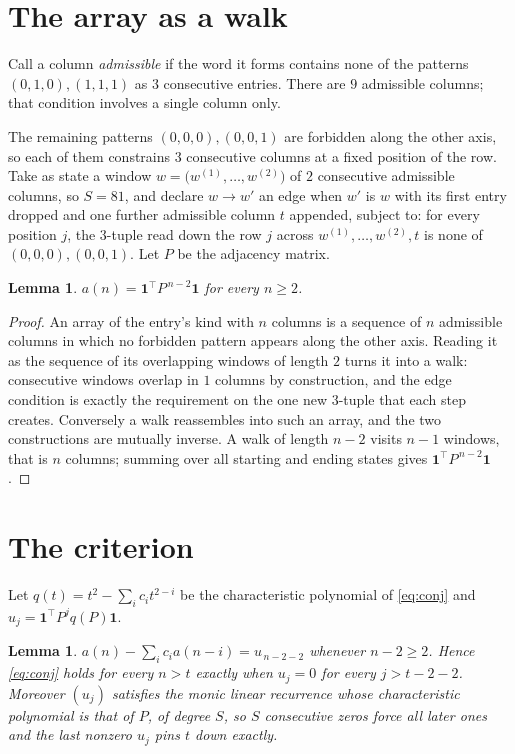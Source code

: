 \documentclass[11pt,a4paper]{article}
\theoremstyle{plain}
\newtheorem{lemma}[theorem]{Lemma}
\theoremstyle{definition}
\begin{document}
\section{The array as a walk}

Call a column \emph{admissible} if the word it forms contains none of the patterns
$(0,1,0), (1,1,1)$ as $3$ consecutive entries. There are $9$ admissible columns; that condition
involves a single column only.

The remaining patterns $(0,0,0), (0,0,1)$ are forbidden along the other axis, so each of them
constrains $3$ consecutive columns at a fixed position of the row. Take as state a
window $w=\bigl(w^{(1)},\dots,w^{(2)}\bigr)$ of $2$ consecutive admissible
columns, so $S=81$, and declare $w\to w'$ an edge when $w'$ is $w$ with its first entry
dropped and one further admissible column $t$ appended, subject to: for every position
$j$, the $3$-tuple read down the row $j$ across $w^{(1)},\dots,w^{(2)},t$
is none of $(0,0,0), (0,0,1)$. Let $P$ be the adjacency matrix.

\begin{lemma}\label{lem:walk}
$a(n)=\mathbf{1}^{\!\top}P^{\,n-2}\mathbf{1}$ for every $n\ge2$.
\end{lemma}

\begin{proof}
An array of the entry's kind with $n$ columns is a sequence of $n$ admissible columns in
which no forbidden pattern appears along the other axis. Reading it as the sequence of its
overlapping windows of length $2$ turns it into a walk: consecutive windows overlap in
$1$ columns by construction, and the edge condition is exactly the requirement on the one
new $3$-tuple that each step creates. Conversely a walk reassembles into such an array,
and the two constructions are mutually inverse. A walk of length $n-2$ visits $n-1$
windows, that is $n$ columns; summing over all starting and ending states gives
$\mathbf{1}^{\!\top}P^{\,n-2}\mathbf{1}$.
\end{proof}

\section{The criterion}

Let $q(t)=t^{2}-\sum_i c_i t^{2-i}$ be the characteristic polynomial of
\eqref{eq:conj} and $u_j=\mathbf{1}^{\!\top}P^{j}q(P)\mathbf{1}$.

\begin{lemma}\label{lem:crit}
$a(n)-\sum_i c_i a(n-i)=u_{\,n-2-2}$ whenever $n-2\ge2$. Hence
\eqref{eq:conj} holds for every $n>t$ exactly when $u_j=0$ for every
$j>t-2-2$. Moreover $(u_j)$ satisfies the monic linear recurrence whose
characteristic polynomial is that of $P$, of degree $S$, so $S$ consecutive zeros force all
later ones and the last nonzero $u_j$ pins $t$ down exactly.
\end{lemma}
\end{document}
